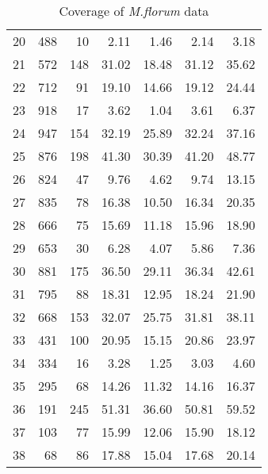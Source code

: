 \begin{table}[t]
\begin{tabular}{lrrr|rrr}
   20 & 488 & 10 & 2.11 & 1.46 & 2.14 & 3.18 \\ 
   21 & 572 & 148 & 31.02 & 18.48 & 31.12 & 35.62 \\ 
   22 & 712 & 91 & 19.10 & 14.66 & 19.12 & 24.44 \\ 
   23 & 918 & 17 & 3.62 & 1.04 & 3.61 & 6.37 \\ 
   24 & 947 & 154 & 32.19 & 25.89 & 32.24 & 37.16 \\ 
   25 & 876 & 198 & 41.30 & 30.39 & 41.20 & 48.77 \\ 
   26 & 824 & 47 & 9.76 & 4.62 & 9.74 & 13.15 \\ 
   27 & 835 & 78 & 16.38 & 10.50 & 16.34 & 20.35 \\ 
   28 & 666 & 75 & 15.69 & 11.18 & 15.96 & 18.90 \\ 
   29 & 653 & 30 & 6.28 & 4.07 & 5.86 & 7.36 \\ 
   30 & 881 & 175 & 36.50 & 29.11 & 36.34 & 42.61 \\ 
   31 & 795 & 88 & 18.31 & 12.95 & 18.24 & 21.90 \\ 
   32 & 668 & 153 & 32.07 & 25.75 & 31.81 & 38.11 \\ 
   33 & 431 & 100 & 20.95 & 15.15 & 20.86 & 23.97 \\ 
   34 & 334 & 16 & 3.28 & 1.25 & 3.03 & 4.60 \\ 
   35 & 295 & 68 & 14.26 & 11.32 & 14.16 & 16.37 \\ 
   36 & 191 & 245 & 51.31 & 36.60 & 50.81 & 59.52 \\ 
   37 & 103 & 77 & 15.99 & 12.06 & 15.90 & 18.12 \\ 
   38 &  68 & 86 & 17.88 & 15.04 & 17.68 & 20.14 \\ 
  \hline
  \hline
\end{tabular}
\caption{Coverage of {\emph{M.florum}} data}
\label{tab:App_mftable}
\end{table}

